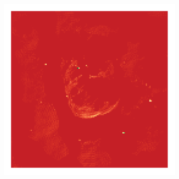 \begin{figure}[h]
\begin{subfigure}[b]{0.3\linewidth}
	\end{subfigure}
	\begin{subfigure}[b]{0.3\linewidth}
		\includegraphics[width=\linewidth, trim={18px 19px 18px 18px}, clip]{./chapters/05.results/g55/L1_model.png}
	\end{subfigure}


\end{figure}
